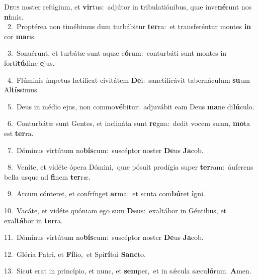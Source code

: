\lettrine{\initial\textcolor{\initialcolor}{D}}{eus} noster refúgium, et \textbf{vir}\-tus:~\star adjútor in tribulatiónibus, quæ inve\-\textbf{né}\-runt nos \textbf{ni}\-mis.\\
{\numbfont\textcolor{\numbcolor}{~2.}}~Proptérea non timébimus dum turbábitur \textbf{ter}\-ra:~\star et transferéntur montes \textbf{in} cor \textbf{ma}\-ris.\par
{\numbfont\textcolor{\numbcolor}{~3.}}~Sonuérunt, et turbátæ sunt aquæ e\-\textbf{ó}\-rum:~\star conturbáti sunt montes in forti\-\textbf{tú}\-dine \textbf{e}\-jus.\par
{\numbfont\textcolor{\numbcolor}{~4.}}~Flúminis ímpetus lætíficat civitátem \textbf{De}\-i:~\star sanctificávit tabernáculum \textbf{su}\-um Al\-\textbf{tís}\-simus.\par
{\numbfont\textcolor{\numbcolor}{~5.}}~Deus in médio ejus, non commo\-\textbf{vé}\-bitur:~\star adjuvábit eam Deus \textbf{ma}\-ne di\-\textbf{lú}\-culo.\par
{\numbfont\textcolor{\numbcolor}{~6.}}~Conturbátæ sunt Gentes, et inclináta sunt \textbf{re}\-gna:~\star dedit vocem suam, \textbf{mo}\-ta est \textbf{ter}\-ra.\par
{\numbfont\textcolor{\numbcolor}{~7.}}~Dóminus virtútum no\-\textbf{bís}\-cum:~\star suscéptor noster \textbf{De}\-us \textbf{Ja}\-cob.\par
{\numbfont\textcolor{\numbcolor}{~8.}}~Veníte, et vidéte ópera Dómini,~\dagger quæ pósuit prodígia super \textbf{ter}\-ram:~\star áuferens bella usque ad \textbf{fi}\-nem \textbf{ter}\-ræ.\par
{\numbfont\textcolor{\numbcolor}{~9.}}~Arcum cónteret, et confrínget \textbf{ar}\-ma:~\star et scuta com\-\textbf{bú}\-ret \textbf{i}\-gni.\par
{\numbfont\textcolor{\numbcolor}{10.}}~Vacáte, et vidéte quóniam ego sum \textbf{De}\-us:~\star exaltábor in Géntibus, et exal\-\textbf{tá}\-bor in \textbf{ter}\-ra.\par
{\numbfont\textcolor{\numbcolor}{11.}}~Dóminus virtútum no\-\textbf{bís}\-cum:~\star suscéptor noster \textbf{De}\-us \textbf{Ja}\-cob.\par
{\numbfont\textcolor{\numbcolor}{12.}}~Glória Patri, et \textbf{Fí}\-lio,~\star et Spi\-\textbf{rí}\-tui \textbf{Sanc}\-to.\par
{\numbfont\textcolor{\numbcolor}{13.}}~Sicut erat in princípio, et nunc, et \textbf{sem}\-per,~\star et in sǽcula sæcu\-\textbf{ló}\-rum. \textbf{A}\-men.\par
